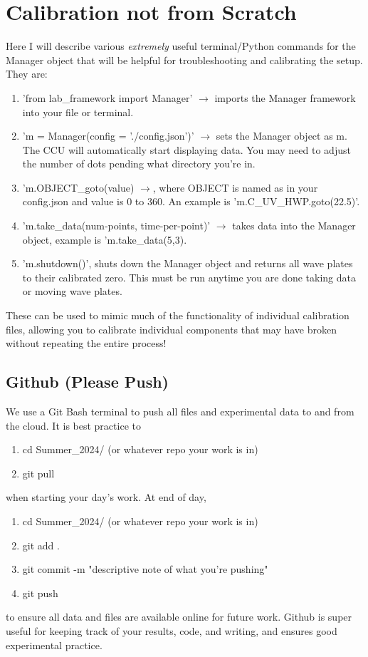 \documentclass{paper}[11pt]
\begin{document}
\section{Calibration not from Scratch}\label{sec:calib_not_from_scratch}
Here I will describe various \textit{extremely} useful terminal/Python commands for the Manager object that will be helpful for troubleshooting and calibrating the setup. They are:
\begin{enumerate}
    \item 'from lab\_framework import Manager' $\rightarrow$ imports the Manager framework into your file or terminal.
    \item 'm = Manager(config = './config.json')' $\rightarrow$ sets the Manager object as m. The CCU will automatically start displaying data. You may need to adjust the number of dots pending what directory you're in.  
    \item 'm.OBJECT\_goto(value) $\rightarrow$, where OBJECT is named as in your config.json and value is 0 to 360. An example is 'm.C\_UV\_HWP.goto(22.5)'.
    \item 'm.take\_data(num-points, time-per-point)' $\rightarrow$ takes data into the Manager object, example is 'm.take\_data(5,3).
    \item 'm.shutdown()', shuts down the Manager object and returns all wave plates to their calibrated zero. This must be run anytime you are done taking data or moving wave plates. 
\end{enumerate}
These can be used to mimic much of the functionality of individual calibration files, allowing you to calibrate individual components that may have broken without repeating the entire process! 

\subsection{Github (Please Push)}
We use a Git Bash terminal to push all files and experimental data to and from the cloud. It is best practice to 
\begin{enumerate}
    \item cd Summer\_2024/ (or whatever repo your work is in)
    \item git pull
\end{enumerate}
when starting your day's work. At end of day,
\begin{enumerate}
    \item cd Summer\_2024/ (or whatever repo your work is in)
    \item git add .
    \item git commit -m "descriptive note of what you're pushing"
    \item git push
\end{enumerate}
to ensure all data and files are available online for future work. Github is super useful for keeping track of your results, code, and writing, and ensures good experimental practice. 
\end{document}
